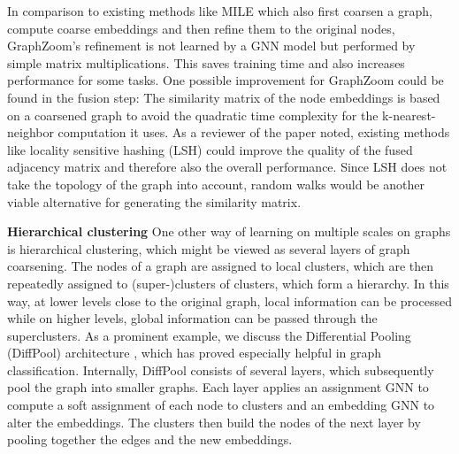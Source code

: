 \documentclass{article}
\begin{document}
In comparison to existing methods like MILE \cite{liang2018mile} which also first coarsen a graph, compute coarse embeddings and then refine them to the original nodes, GraphZoom's refinement is not learned by a GNN model but performed by simple matrix multiplications. This saves training time and also increases performance for some tasks.
One possible improvement for GraphZoom could be found in the fusion step: The similarity matrix of the node embeddings is based on a coarsened graph to avoid the quadratic time complexity for the k-nearest-neighbor computation it uses. As a reviewer of the paper noted, existing methods like locality sensitive hashing (LSH) \cite{wang2014hashing} could improve the quality of the fused adjacency matrix and therefore also the overall performance. Since LSH does not take the topology of the graph into account, random walks \cite{ zhuang2018dual} would be another viable alternative for generating the similarity matrix.



\textbf{Hierarchical clustering}
One other way of learning on multiple scales on graphs is hierarchical clustering, which might be viewed as several layers of graph coarsening.
The nodes of a graph are assigned to local clusters, which are then repeatedly assigned to (super-)clusters of clusters, which form a hierarchy. In this way, at lower levels close to the original graph, local information can be processed while on higher levels, global information can be passed through the superclusters.
As a prominent example, we discuss the Differential Pooling (DiffPool) architecture \cite{ying2018hierarchical}, which has proved especially helpful in graph classification. %
Internally, DiffPool consists of several layers, which subsequently pool the graph into smaller graphs. Each layer applies an assignment GNN to compute a soft assignment of each node to clusters and an embedding GNN to alter the embeddings. The clusters then build the nodes of the next layer by pooling together the edges and the new embeddings.

\end{document}
